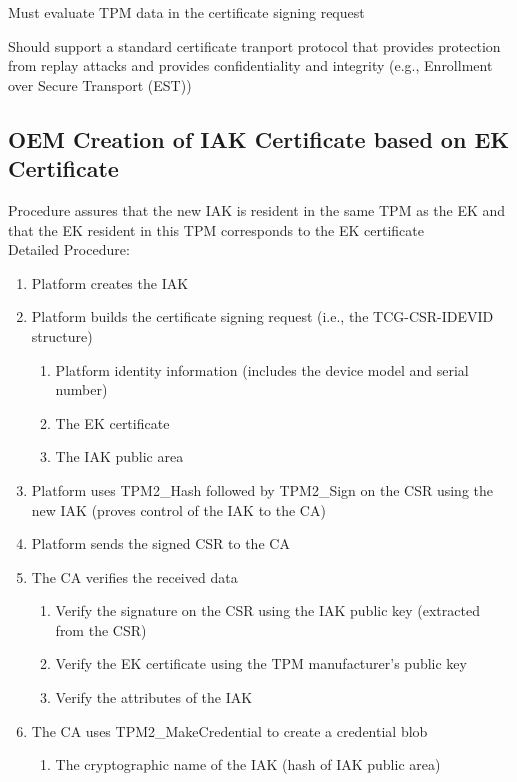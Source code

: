 \documentclass{article}
\begin{document}
Must evaluate TPM data in the certificate signing request

Should support a standard certificate tranport protocol that provides protection from replay attacks and provides confidentiality and integrity (e.g., Enrollment over Secure Transport (EST))


\subsection*{OEM Creation of IAK Certificate based on EK Certificate}

Procedure assures that the new IAK is resident in the same TPM as the EK and that the EK resident in this TPM corresponds to the EK certificate  \\

Detailed Procedure:
\begin{enumerate}
    \item Platform creates the IAK
    \item Platform builds the certificate signing request (i.e., the TCG-CSR-IDEVID structure)
    \begin{enumerate}
        \item Platform identity information (includes the device model and serial number)
        \item The EK certificate
        \item The IAK public area
    \end{enumerate}
    \item Platform uses TPM2\_Hash followed by TPM2\_Sign on the CSR using the new IAK (proves control of the IAK to the CA)
    \item Platform sends the signed CSR to the CA
    \item The CA verifies the received data
    \begin{enumerate}
        \item Verify the signature on the CSR using the IAK public key (extracted from the CSR)
        \item Verify the EK certificate using the TPM manufacturer's public key
        \item Verify the attributes of the IAK
    \end{enumerate}
    \item The CA uses TPM2\_MakeCredential to create a credential blob 
    \begin{enumerate}
        \item The cryptographic name of the IAK (hash of IAK public area)

\end{enumerate}
\end{enumerate}
\end{document}
